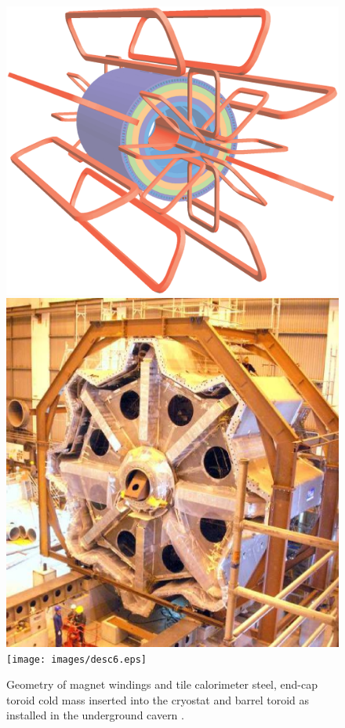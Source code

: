 		
		\begin{figure}[h]
			\begin{center}
				\includegraphics[scale=0.3]{images/ATLcoilGeom.eps}
				\includegraphics[scale=0.3]{images/desc5.eps}\\
				\texttt{[image: images/desc6.eps]}
			\end{center}
			\caption{Geometry of magnet windings and tile calorimeter steel, end-cap toroid cold mass inserted into the cryostat and barrel toroid as installed in the underground cavern \cite{Aad:1129811}.}
			\label{fig:ATLAS_magnet}
		\end{figure}

